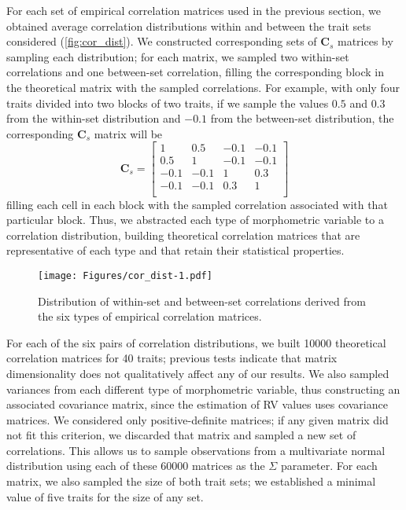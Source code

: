\documentclass[12pt,]{article}
\begin{document}
For each set of empirical correlation matrices used in the previous
section, we obtained average correlation distributions within and
between the trait sets considered (\autoref{fig:cor_dist}). We
constructed corresponding sets of $\mathbf{C}_{s}$ matrices by sampling
each distribution; for each matrix, we sampled two within-set
correlations and one between-set correlation, filling the corresponding
block in the theoretical matrix with the sampled correlations. For
example, with only four traits divided into two blocks of two traits, if
we sample the values $0.5$ and $0.3$ from the within-set distribution
and $-0.1$ from the between-set distribution, the corresponding
$\mathbf{C}_{s}$ matrix will be \[
\mathbf{C}_s =
\begin{bmatrix}
1 & 0.5 & -0.1 & -0.1 \\
0.5 & 1 & -0.1 & -0.1 \\
-0.1 & -0.1 & 1 & 0.3 \\
-0.1 & -0.1 & 0.3 & 1 \\
\end{bmatrix}
\] filling each cell in each block with the sampled correlation
associated with that particular block. Thus, we abstracted each type of
morphometric variable to a correlation distribution, building
theoretical correlation matrices that are representative of each type
and that retain their statistical properties.

\begin{figure}[htbp]
\centering
\texttt{[image: Figures/cor\_dist-1.pdf]}
\caption{Distribution of within-set and between-set correlations derived
from the six types of empirical correlation matrices.
\label{fig:cor_dist}}
\end{figure}

For each of the six pairs of correlation distributions, we built 10000
theoretical correlation matrices for 40 traits; previous tests indicate
that matrix dimensionality does not qualitatively affect any of our
results. We also sampled variances from each different type of
morphometric variable, thus constructing an associated covariance
matrix, since the estimation of RV values uses covariance matrices. We
considered only positive-definite matrices; if any given matrix did not
fit this criterion, we discarded that matrix and sampled a new set of
correlations. This allows us to sample observations from a multivariate
normal distribution using each of these 60000 matrices as the $\Sigma$
parameter. For each matrix, we also sampled the size of both trait sets;
we established a minimal value of five traits for the size of any set.
\end{document}
